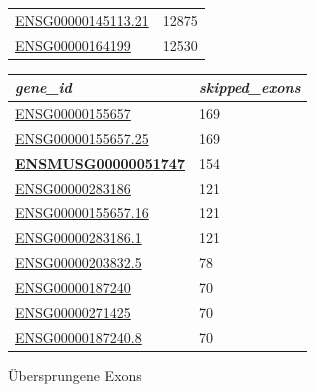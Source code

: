 \documentclass[12pt]{article}
\begin{document}
\begin{figure}[htbp]
\begin{minipage}{0.45\textwidth}
\begin{tabular}{l|l}
            \href{https://asia.ensembl.org/Homo_sapiens/Gene/Summary?db=core;g=ENSG00000145113;r=3:195746765-195811973}{ENSG00000145113.21} & 12875               \\
            \href{https://asia.ensembl.org/Homo_sapiens/Gene/Summary?db=core;g=ENSG00000164199;r=5:90529344-91164437}{ENSG00000164199}    & 12530               \\
		\end{tabular}
	\end{minipage}%
	\hfill %
	\begin{minipage}{0.45\textwidth}
		\centering
		\caption{Übersprungene Exons}
		\begin{tabular}{l|l}
			\textit{\textbf{gene\_id}}                 & \textit{\textbf{skipped\_exons}} \\\hline
            \href{https://asia.ensembl.org/Homo_sapiens/Gene/Summary?db=core;g=ENSG00000155657;r=2:178525989-178830802}{ENSG00000155657}    & 169                \\
            \href{https://asia.ensembl.org/Homo_sapiens/Gene/Summary?db=core;g=ENSG00000155657;r=2:178525989-178830802}{ENSG00000155657.25} & 169                \\
            \href{https://asia.ensembl.org/Mus_musculus/Gene/Summary?db=core;g=ENSMUSG00000051747;r=2:76534324-76812891}{\textbf{ENSMUSG00000051747}} & 154                \\
            \href{https://asia.ensembl.org/Homo_sapiens/Gene/Idhistory?g=ENSG00000283186}{ENSG00000283186}    & 121                \\
            \href{https://asia.ensembl.org/Homo_sapiens/Gene/Summary?db=core;g=ENSG00000155657;r=2:178525989-178830802}{ENSG00000155657.16} & 121                \\
            \href{https://asia.ensembl.org/Homo_sapiens/Gene/Idhistory?g=ENSG00000283186}{ENSG00000283186.1}  & 121                \\
            \href{https://asia.ensembl.org/Homo_sapiens/Gene/Idhistory?g=ENSG00000203832}{ENSG00000203832.5}  & 78                 \\
            \href{https://asia.ensembl.org/Homo_sapiens/Gene/Summary?db=core;g=ENSG00000187240;r=11:103109410-103479863}{ENSG00000187240}    & 70                 \\
            \href{https://asia.ensembl.org/Homo_sapiens/Gene/Summary?db=core;g=ENSG00000271425;r=1:146064711-146229000}{ENSG00000271425}    & 70                 \\
            \href{https://asia.ensembl.org/Homo_sapiens/Gene/Summary?db=core;g=ENSG00000187240;r=11:103109410-103479863}{ENSG00000187240.8}  & 70                 \\
		\end{tabular}
	\end{minipage}
\end{figure}
\end{document}

